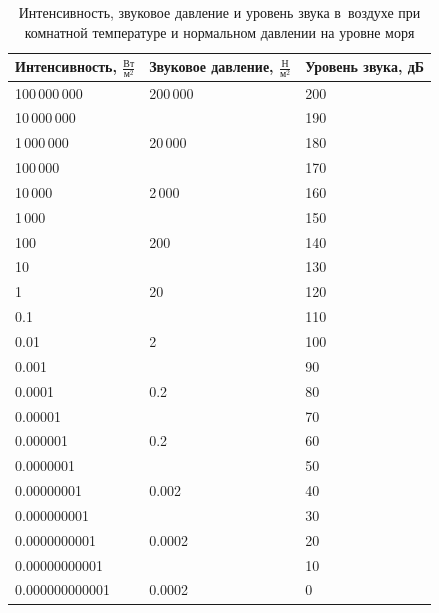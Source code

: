 \begin{table}[H]
\centering
\caption{Интенсивность, звуковое давление и уровень звука в воздухе при комнатной температуре и нормальном давлении на уровне моря}
\vspace{0.5em}
\begin{tabular}{ll p{1.5cm}}
\toprule
Интенсивность, $\frac{\text{Вт}}{\text{м}^2}$ & Звуковое давление, $\frac{\text{Н}}{\text{м}^2}$ & Уровень звука, дБ \\ \midrule
		   100\,000\,000 & 200\,000 & 200 \\
\hphantom{0}10\,000\,000 &  & 190 \\
\hphantom{00}1\,000\,000 & \hphantom{0}20\,000 & 180 \\
\hphantom{000\,}100\,000 & & 170 \\
\hphantom{0000\,}10\,000 & \hphantom{00}2\,000& 160 \\
\hphantom{00000\,}1\,000 & & 150 \\
\hphantom{000000\,\,}100 &  \hphantom{000\,}200 & 140 \\
\hphantom{0000000\,\,}10 & & 130 \\
\hphantom{00000000\,\,}1 & \hphantom{0000\,}20 & 120 \\
\hphantom{00000000\,\,}0.1	&  &  110\\
\hphantom{00000000\,\,}0.01	& \hphantom{00000\,}2 &  100\\
\hphantom{00000000\,\,}0.001	&  &  90\\
\hphantom{00000000\,\,}0.0001	& \hphantom{00000\,}0.2 &  80\\
\hphantom{00000000\,\,}0.00001	&  &  70\\
\hphantom{00000000\,\,}0.000001	& \hphantom{00000\,}0.2 &  60\\
\hphantom{00000000\,\,}0.0000001	&  &  50\\
\hphantom{00000000\,\,}0.00000001	& \hphantom{00000\,}0.002 &  40\\
\hphantom{00000000\,\,}0.000000001	&  &  30\\
\hphantom{00000000\,\,}0.0000000001	& \hphantom{00000\,}0.0002 &  20\\
\hphantom{00000000\,\,}0.00000000001	&  &  10\\
\hphantom{00000000\,\,}0.000000000001	& \hphantom{00000\,}0.0002 &  0\\\bottomrule
\end{tabular}
\end{table}



